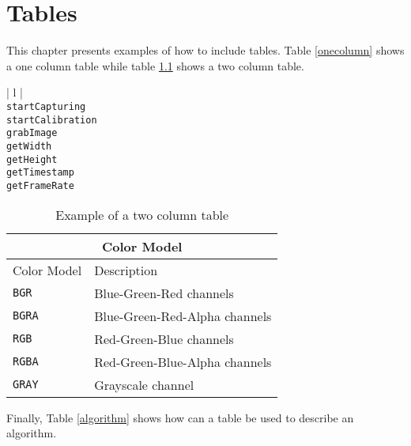 \chapter{Tables} \label{tables}

This chapter presents examples of how to include tables. Table \ref{onecolumn} shows a one column
table while table \ref{twocolumn} shows a two column table.

\begin{table}[ht]
\caption{Example of a one column table}
\begin{center}
\begin{tabular}{| l |}
	\hline 
	 \\
	\hline \hline
	\texttt{startCapturing} \\
	\texttt{startCalibration} \\
	\texttt{grabImage}	\\
	\texttt{getWidth} \\
	\texttt{getHeight} \\
	\texttt{getTimestamp} \\
	\texttt{getFrameRate} \\
	\hline
\end{tabular}
\end{center}
\label{onecolumn}
\end{table}

\begin{table}[ht]
\caption{Example of a two column table}
\begin{center}
\begin{tabular}{| l | l |}
	\multicolumn{2}{c}{Color Model} \\
	\hline 
	Color Model 		& Description \\
	\hline \hline
	\texttt{BGR} 		& Blue-Green-Red channels \\
	\texttt{BGRA} 		& Blue-Green-Red-Alpha channels \\
	\texttt{RGB}	 	& Red-Green-Blue channels \\
	\texttt{RGBA}	 	& Red-Green-Blue-Alpha channels \\
	\texttt{GRAY}	 	& Grayscale channel \\
	\hline
\end{tabular}
\end{center}
\label{twocolumn}
\end{table}

Finally, Table \ref{algorithm} shows how can a table be used to describe an algorithm.

